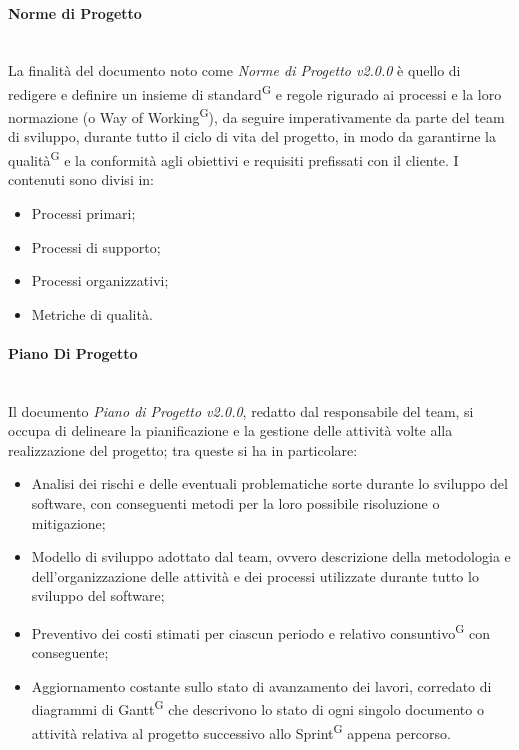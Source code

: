 \documentclass[8pt]{article}
\newcommand{\glossterm}[1]{#1\textsuperscript{G}} %
\newcommand{\subsubsubsection}[1]{\paragraph{#1}\mbox{}\\}
\begin{document}
\subsubsubsection{Norme di Progetto}
La finalità del documento noto come \textit{Norme di Progetto v2.0.0} è quello di redigere e definire un insieme di \glossterm{standard} e regole rigurado ai processi e la loro normazione (o \glossterm{Way of Working}), da seguire imperativamente da parte del team di sviluppo, durante tutto il ciclo di vita del progetto, in modo da garantirne la \glossterm{qualità} e la conformità agli obiettivi e requisiti prefissati con il cliente. I contenuti sono divisi in:
\begin{itemize}
    \item Processi primari;
    \item Processi di supporto;
    \item Processi organizzativi;
    \item Metriche di qualità.
\end{itemize}

\subsubsubsection{Piano Di Progetto}
Il documento \textit{Piano di Progetto v2.0.0}, redatto dal responsabile del team, si occupa di delineare la pianificazione e la gestione delle attività volte alla realizzazione del progetto; tra queste si ha in particolare:
\begin{itemize}
    \item Analisi dei rischi e delle eventuali problematiche sorte durante lo sviluppo del software, con conseguenti metodi per la loro possibile risoluzione o mitigazione;
    \item Modello di sviluppo adottato dal team, ovvero descrizione della metodologia e dell'organizzazione delle attività e dei processi utilizzate durante tutto lo sviluppo del software; 
    \item Preventivo dei costi stimati per ciascun periodo e relativo \glossterm{consuntivo} con conseguente;
    \item Aggiornamento costante sullo stato di avanzamento dei lavori, corredato di diagrammi di \glossterm{Gantt} che descrivono lo stato di ogni singolo documento o attività relativa al progetto successivo allo \glossterm{Sprint} appena percorso.
\end{itemize}
\end{document}

